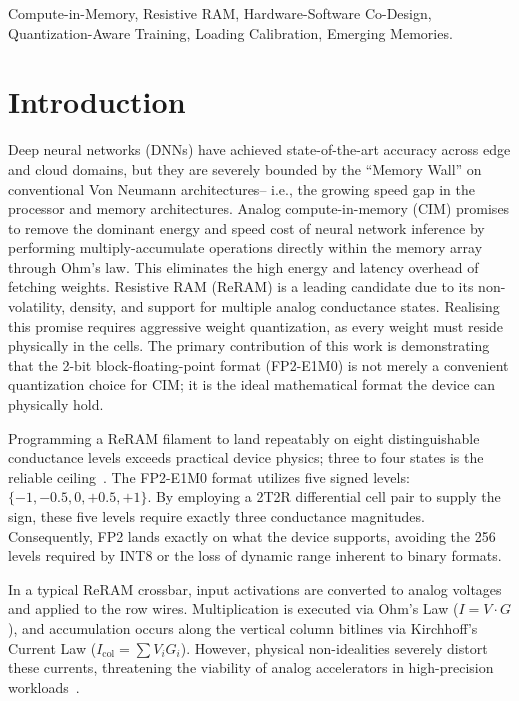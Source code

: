 \documentclass[conference]{IEEEtran}
\begin{document}
\begin{IEEEkeywords}
Compute-in-Memory, Resistive RAM, Hardware-Software Co-Design, Quantization-Aware Training, Loading Calibration, Emerging Memories.
\end{IEEEkeywords}

\section{Introduction}
Deep neural networks (DNNs) have achieved state-of-the-art accuracy across edge and cloud domains, but they are severely bounded by the ``Memory Wall'' on conventional Von Neumann architectures-- i.e., the growing speed gap in the processor and memory architectures. Analog compute-in-memory (CIM) promises to remove the dominant energy and speed cost of neural network inference by performing multiply-accumulate operations directly within the memory array through Ohm's law. This eliminates the high energy and latency overhead of fetching weights. Resistive RAM (ReRAM) is a leading candidate due to its non-volatility, density, and support for multiple analog conductance states. Realising this promise requires aggressive weight quantization, as every weight must reside physically in the cells. The primary contribution of this work is demonstrating that the 2-bit block-floating-point format (FP2-E1M0) is not merely a convenient quantization choice for CIM; it is the ideal mathematical format the device can physically hold.

Programming a ReRAM filament to land repeatably on eight distinguishable conductance levels exceeds practical device physics; three to four states is the reliable ceiling~\cite{perez2021}. The FP2-E1M0 format utilizes five signed levels: $\{-1, -0.5, 0, +0.5, +1\}$. By employing a 2T2R differential cell pair to supply the sign, these five levels require exactly three conductance magnitudes. Consequently, FP2 lands exactly on what the device supports, avoiding the 256 levels required by INT8 or the loss of dynamic range inherent to binary formats.

In a typical ReRAM crossbar, input activations are converted to analog voltages and applied to the row wires. Multiplication is executed via Ohm's Law ($I = V \cdot G$), and accumulation occurs along the vertical column bitlines via Kirchhoff's Current Law ($I_{\text{col}} = \sum V_i G_i$). However, physical non-idealities severely distort these currents, threatening the viability of analog accelerators in high-precision workloads~\cite{shanbhag}.
\end{document}
